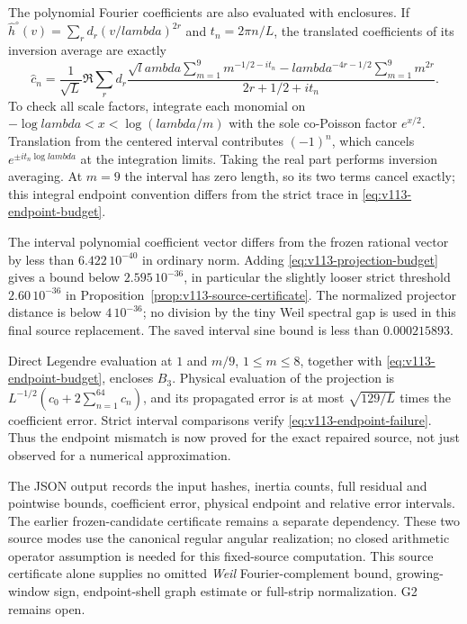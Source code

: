 \documentclass[11pt]{article}
\def\lambda{lambda}%
\theoremstyle{remark}
\begin{document}
The polynomial Fourier coefficients are also evaluated with enclosures.
If $\widehat h^\circ(v)=\sum_r d_r(v/\lambda)^{2r}$ and
$t_n=2\pi n/L$, the translated coefficients of its inversion average
are exactly
\begin{equation}\label{eq:v113-mellin-polynomial}
 \widehat c_n=\frac1{\sqrt L}\Re\sum_r d_r
 \frac{\displaystyle\sqrt\lambda\sum_{m=1}^{9}m^{-1/2-it_n}
       -\displaystyle\lambda^{-4r-1/2}\sum_{m=1}^{9}m^{2r}}
      {2r+1/2+it_n}.
\end{equation}
To check all scale factors, integrate each monomial on
$-\log\lambda<x<\log(\lambda/m)$ with the sole co-Poisson factor
$e^{x/2}$. Translation from the centered interval contributes
$(-1)^n$, which cancels $e^{\pm it_n\log\lambda}$ at the integration
limits. Taking the real part performs inversion averaging. At $m=9$
the interval has zero length, so its two terms cancel exactly; this
integral endpoint convention differs from the strict trace in
\eqref{eq:v113-endpoint-budget}.

The interval polynomial coefficient vector differs from the frozen
rational vector by less than $6.422\,10^{-40}$ in ordinary norm.
Adding \eqref{eq:v113-projection-budget} gives a bound below
$2.595\,10^{-36}$, in particular the slightly looser strict threshold
$2.60\,10^{-36}$ in Proposition~\ref{prop:v113-source-certificate}.
The normalized projector distance is below $4\,10^{-36}$; no division
by the tiny Weil spectral gap is used in this final source replacement.
The saved interval sine bound is less than $0.000215893$.

Direct Legendre evaluation at $1$ and $m/9$, $1\le m\le8$, together
with \eqref{eq:v113-endpoint-budget}, encloses $B_3$.
Physical evaluation of the projection is
$L^{-1/2}(c_0+2\sum_{n=1}^{64}c_n)$, and its propagated error is
at most $\sqrt{129/L}$ times the coefficient error. Strict interval
comparisons verify \eqref{eq:v113-endpoint-failure}. Thus the endpoint
mismatch is now proved for the exact repaired source, not just observed
for a numerical approximation.

The JSON output records the input hashes, inertia counts, full residual
and pointwise bounds, coefficient error, physical endpoint and relative
error intervals. The earlier frozen-candidate certificate remains a
separate dependency. These two source modes use the canonical regular
angular realization; no closed arithmetic operator assumption is needed
for this fixed-source computation. This source certificate alone supplies
no omitted \emph{Weil} Fourier-complement bound, growing-window sign,
endpoint-shell graph estimate or full-strip normalization. G2 remains open.
\end{document}
